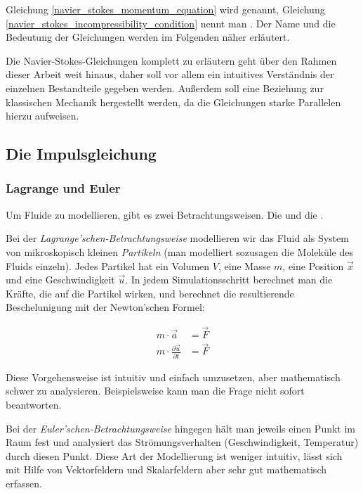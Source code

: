 Gleichung \eqref{navier_stokes_momentum_equation} wird
 genannt, Gleichung
\eqref{navier_stokes_incompressibility_condition} nennt man
. Der Name und die Bedeutung der
Gleichungen werden im Folgenden näher erläutert.

Die Navier-Stokes-Gleichungen komplett zu erläutern geht über den Rahmen dieser
Arbeit weit hinaus, daher soll vor allem ein intuitives Verständnis der
einzelnen Bestandteile gegeben werden. Außerdem soll eine Beziehung zur
klassischen Mechanik hergestellt werden, da die Gleichungen starke Parallelen
hierzu aufweisen.

\subsection{Die Impulsgleichung}

\subsubsection{Lagrange und Euler}

Um Fluide zu modellieren, gibt es zwei Betrachtungsweisen. Die
 und die
.

Bei der \emph{Lagrange'schen-Betrachtungsweise} modellieren wir das Fluid als System
von mikroskopisch kleinen \emph{Partikeln} (man modelliert sozusagen die
Moleküle des Fluids einzeln). Jedes Partikel hat ein Volumen $V$, eine
Masse $m$, eine Position $\vec{x}$ und eine Geschwindigkeit $\vec{u}$. In jedem
Simulationsschritt berechnet man die Kräfte, die auf die Partikel wirken, und
berechnet die resultierende Beschelunigung mit der Newton'schen Formel:

\begin{align*}
m \cdot \vec{a} &= \vec{F} \\
m \cdot \frac{\partial \vec{u}}{\partial t} &= \vec{F}
\end{align*}

Diese Vorgehensweise ist intuitiv und einfach umzusetzen, aber mathematisch
schwer zu analysieren. Beispielsweise kann man die Frage  nicht sofort
beantworten.

Bei der \emph{Euler'schen-Betrachtungsweise} hingegen hält man jeweils einen Punkt im
Raum fest und analysiert das Strömungsverhalten (Geschwindigkeit, Temperatur)
durch diesen Punkt. Diese Art der Modellierung ist weniger intuitiv, lässt sich
mit Hilfe von Vektorfeldern und Skalarfeldern aber sehr gut mathematisch erfassen.


